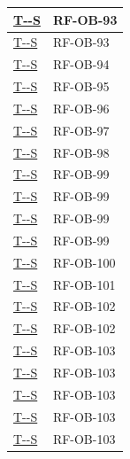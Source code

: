 \documentclass[a4paper,12pt]{article}
\newcounter{testsys}
\newcommand{\systestref}{%
  \hyperlink{T-\arabic{testsys}-S}{T-\arabic{testsys}-S}%
}
\begin{document}
\begin{center}
\begin{longtable}{|>{\centering\arraybackslash}p{5cm}|>{\centering\arraybackslash}p{9cm}|}
\stepcounter{testsys}
\systestref & RF-OB-93 \\
\hline

\stepcounter{testsys}
\systestref & RF-OB-93 \\
\hline

\stepcounter{testsys}
\systestref & RF-OB-94 \\
\hline

\stepcounter{testsys}
\systestref & RF-OB-95 \\
\hline

\stepcounter{testsys}
\systestref & RF-OB-96 \\
\hline

\stepcounter{testsys}
\systestref & RF-OB-97 \\
\hline

\stepcounter{testsys}
\systestref & RF-OB-98 \\
\hline

\stepcounter{testsys}
\systestref & RF-OB-99 \\
\hline

\stepcounter{testsys}
\systestref & RF-OB-99 \\
\hline

\stepcounter{testsys}
\systestref & RF-OB-99 \\
\hline

\stepcounter{testsys}
\systestref & RF-OB-99 \\
\hline

\stepcounter{testsys}
\systestref & RF-OB-100 \\
\hline

\stepcounter{testsys}
\systestref & RF-OB-101 \\
\hline

\stepcounter{testsys}
\systestref & RF-OB-102 \\
\hline

\stepcounter{testsys}
\systestref & RF-OB-102 \\
\hline

\stepcounter{testsys}
\systestref & RF-OB-103 \\
\hline

\stepcounter{testsys}
\systestref & RF-OB-103 \\
\hline

\stepcounter{testsys}
\systestref & RF-OB-103 \\
\hline

\stepcounter{testsys}
\systestref & RF-OB-103 \\
\hline

\stepcounter{testsys}
\systestref & RF-OB-103 \\
\hline


\end{longtable}
\end{center}
\end{document}
